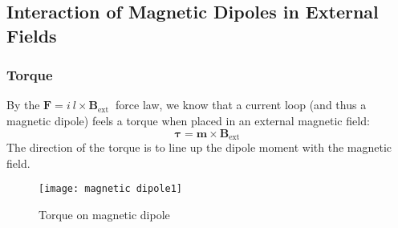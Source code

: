 \subsection{Interaction of Magnetic Dipoles in External Fields }
\subsubsection{Torque}
\begin{minipage}{0.65\textwidth}
	By the $\mathbf{F}=i\ l \times \mathbf{B}_{\text {ext }}$ force law, we know that a current loop (and thus a magnetic dipole) feels a torque when placed in an external magnetic field:
	$$
	\boldsymbol{\tau}=\boldsymbol{m} \times \mathbf{B}_{\text {ext }}
	$$
	The direction of the torque is to line up the dipole moment with the magnetic field.
\end{minipage}
\begin{minipage}{0.35\textwidth}
	\begin{figure}[H]
		\centering
		\texttt{[image: magnetic dipole1]}
		\caption{Torque on magnetic dipole}
		\label{magnetic dipole1}
	\end{figure}
\end{minipage}
